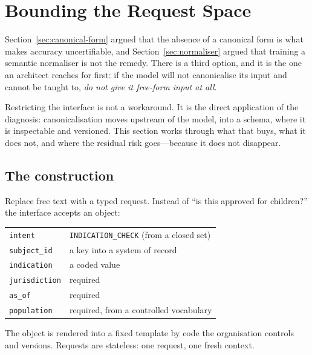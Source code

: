 \section{Bounding the Request Space}
\label{sec:bounded}

Section~\ref{sec:canonical-form} argued that the absence of a canonical form is what
makes accuracy uncertifiable, and Section~\ref{sec:normaliser} argued that training a
semantic normaliser is not the remedy. There is a third option, and it is the one an
architect reaches for first: if the model will not canonicalise its input and cannot
be taught to, \emph{do not give it free-form input at all}.

Restricting the interface is not a workaround. It is the direct application of the
diagnosis: canonicalisation moves upstream of the model, into a schema, where it is
inspectable and versioned. This section works through what that buys, what it does
not, and where the residual risk goes---because it does not disappear.

\subsection{The construction}

Replace free text with a typed request. Instead of ``is this approved for children?''
the interface accepts an object:

\begin{center}
\small
\begin{tabular}{@{}l>{\raggedright\arraybackslash}p{7.2cm}@{}}
\toprule
\texttt{intent} & \texttt{INDICATION\_CHECK} (from a closed set) \\
\texttt{subject\_id} & a key into a system of record \\
\texttt{indication} & a coded value \\
\texttt{jurisdiction} & required \\
\texttt{as\_of} & required \\
\texttt{population} & required, from a controlled vocabulary \\
\bottomrule
\end{tabular}
\end{center}

The object is rendered into a fixed template by code the organisation controls and
versions. Requests are stateless: one request, one fresh context.

